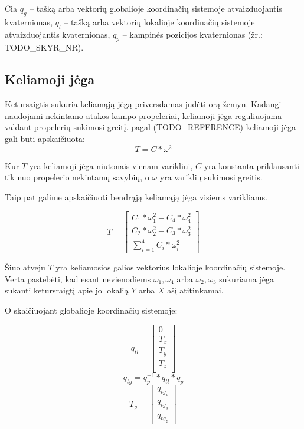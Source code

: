 \documentclass[12pt, a4paper, lithuanian, final]{article}
\begin{document}
Čia $q_{g}$ -- tašką arba vektorių globalioje koordinačių sistemoje atvaizduojantis kvaternionas, $q_{l}$ -- tašką arba vektorių lokalioje koordinačių sistemoje atvaizduojantis kvaternionas, $q_{p}$ -- kampinės pozicijos kvaternionas (žr.: TODO\_SKYR\_NR).





\subsection{Keliamoji jėga}

Ketursaigtis sukuria keliamąją jėgą priversdamas judėti orą žemyn.
Kadangi naudojami nekintamo atakos kampo propeleriai, keliamoji jėga reguliuojama valdant propelerių sukimosi greitį.
pagal (TODO\_REFERENCE) keliamoji jėga gali būti apskaičiuota:
\begin{equation}
	T = C * \omega^2
\end{equation}

Kur $T$ yra keliamoji jėga niutonais vienam varikliui, $C$ yra konstanta priklausanti tik nuo propelerio nekintamų savybių, o $\omega$ yra variklių sukimosi greitis.

Taip pat galime apskaičiuoti bendrąją keliamąją jėga visiems varikliams.

\begin{equation}
	T = \left[
		\begin{array}{c}
			C_{1} * \omega_{1}^2 - C_{4} * \omega_{4}^2 \\
			C_{2} * \omega_{2}^2 - C_{3} * \omega_{3}^2\\
			\displaystyle\sum_{i=1}^{4} C_i * \omega_i^2
		\end{array}
	\right]
\end{equation}

Šiuo atveju $T$ yra keliamosios galios vektorius lokalioje koordinačių sistemoje.
Verta pastebėti, kad esant nevienodiems $\omega_{1}, \omega_{4}$ arba $\omega_{2}, \omega_{3}$ sukuriama jėga sukanti ketursraigtį apie jo lokalią $Y$ arba $X$ ašį atitinkamai.

O skaičiuojant globalioje koordinačių sistemoje:

\begin{equation}
q_{tl} = \left[
		\begin{array}{c}
			0\\
			T_x\\
			T_y\\
			T_z\\
		\end{array}
		\right]
\end{equation}
\begin{equation}
	q_{tg} = q_{p}^{-1} * q_{tl} * q_{p}
\end{equation}
\begin{equation}
	T_g = \left[
		\begin{array}{c}
			q_{tg_x} \\
			q_{tg_y} \\
			q_{tg_z}
		\end{array}
	\right]
\end{equation}
\end{document}
